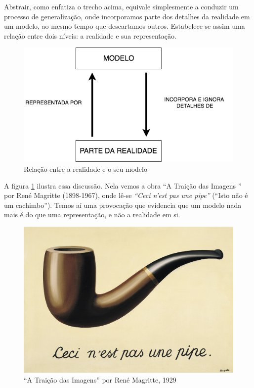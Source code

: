 Abstrair, como enfatiza o trecho acima, equivale simplesmente a conduzir um processo de generalização, onde incorporamos parte dos detalhes da realidade em um modelo, ao mesmo tempo que descartamos outros. Estabelece-se assim uma relação entre dois níveis: a realidade e sua representação.

\begin{figure}[!htb]
	\caption{Relação entre a realidade e o seu modelo}
	\begin{center}
	    \includegraphics[scale=0.65]{imagens/modelo_e_realidade.png}
	\end{center}
\end{figure}

A figura \ref{fig:pipe} ilustra essa discussão. Nela vemos a obra ``A Traição das Imagens '' por René Magritte (1898-1967), onde lê-se \textit{``Ceci n'est pas une pipe''} (``Isto não é um cachimbo''). Temos aí uma provocação que evidencia que um modelo nada mais é do que uma representação, e não a realidade em si.

\begin{figure}[!htb]
	\caption{``A Traição das Imagens'' por René Magritte, 1929}
	\begin{center}
	    \includegraphics[scale=0.75]{imagens/pipe}
	\end{center}
	\label{fig:pipe}
\end{figure}

